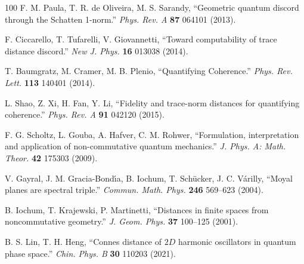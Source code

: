 \documentclass[a4paper,12pt]{article}
\begin{document}
\begin{thebibliography}{100}
 F. M. Paula, T. R. de Oliveira, M. S. Sarandy, ``Geometric quantum discord through the Schatten 1-norm.'' {\it Phys. Rev. A} {\bf 87} 064101 (2013).

 F. Ciccarello, T. Tufarelli, V. Giovannetti, ``Toward computability of trace distance discord.'' {\it New J. Phys.} {\bf 16} 013038 (2014).

 T. Baumgratz, M. Cramer, M. B. Plenio, ``Quantifying Coherence.'' {\it Phys. Rev. Lett.} {\bf 113} 140401 (2014).

 L. Shao, Z. Xi, H. Fan, Y. Li, ``Fidelity and trace-norm distances for quantifying coherence.'' {\it Phys. Rev. A} {\bf 91} 042120 (2015).

 F. G. Scholtz, L. Gouba, A. Hafver, C. M. Rohwer, ``Formulation, interpretation and application of non-commutative quantum mechanics.'' {\it J. Phys. A: Math. Theor.} {\bf 42} 175303 (2009).

 V. Gayral, J. M. Gracia-Bond\'{\i}a, B. Iochum, T. Sch\"{u}cker, J. C. V\'{a}rilly, ``Moyal planes are spectral triple.'' {\it Commun. Math. Phys.} {\bf 246} 569–623 (2004).

 B. Iochum, T. Krajewski, P. Martinetti, ``Distances in finite spaces from noncommutative geometry.'' {\it J. Geom. Phys.} {\bf 37} 100–125 (2001).

 B. S. Lin, T. H. Heng, ``Connes distance of $2D$ harmonic oscillators in quantum phase space.'' {\it Chin. Phys. B} {\bf 30} 110203 (2021).







\end{thebibliography}
\end{document}
